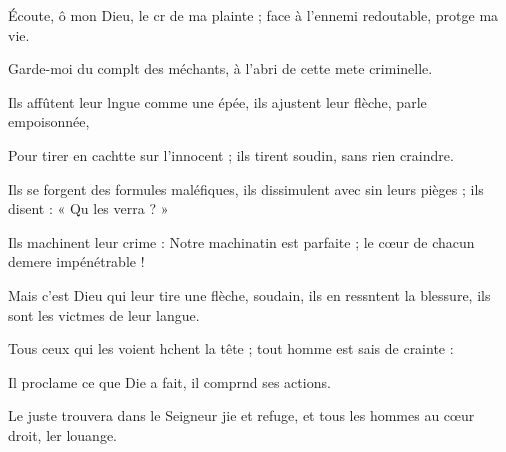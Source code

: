 \item Écoute, ô mon Dieu, le cr de ma plainte ;\psstar{} face à l’ennemi redoutable, protge ma vie.
\item Garde-moi du complt des méchants,\psstar{} à l’abri de cette mete criminelle.
\item Ils affûtent leur lngue comme une épée,\psstar{} ils ajustent leur flèche, parle empoisonnée,
\item Pour tirer en cachtte sur l’innocent ;\psstar{} ils tirent soudin, sans rien craindre.
\item Ils se forgent des formules maléfiques,\pscross{} ils dissimulent avec sin leurs pièges ;\psstar{} ils disent : « Qu les verra ? »
\item Ils machinent leur crime :\pscross{} Notre machinatin est parfaite ;\psstar{} le cœur de chacun demere impénétrable !
\item Mais c’est Dieu qui leur tire une flèche,\pscross{} soudain, ils en ressntent la blessure,\psstar{} ils sont les victmes de leur langue.
\item Tous ceux qui les voient hchent la tête ;\psstar{} tout homme est sais de crainte :
\item Il proclame ce que Die a fait,\psstar{} il comprnd ses actions.
\item Le juste trouvera dans le Seigneur jie et refuge,\psstar{} et tous les hommes au cœur droit, ler louange.